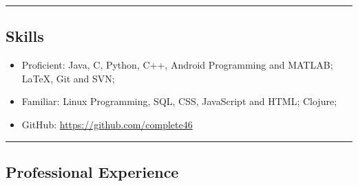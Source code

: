 \documentclass[10pt,letterpaper]{article}
\makeatletter
\newcommand{\headerrow}[2]
{\begin{tabular*}{\linewidth}{l@{\extracolsep{\fill}}r}
	#1 &
	#2 \\
\end{tabular*}}
\makeatother
\begin{document}
%
%
%
\hrule
\vspace{-0.4em}
\subsection*{Skills}


\begin{itemize}
    \parskip=0.01em
     \item Proficient: Java, C, Python, C++, Android Programming and MATLAB; LaTeX, Git and SVN;
     \item Familiar: Linux Programming, SQL, CSS, JavaScript and HTML; Clojure;
     \item GitHub: \url{https://github.com/complete46}
\end{itemize}


\hrule

\subsection*{Professional Experience}
\end{document}
